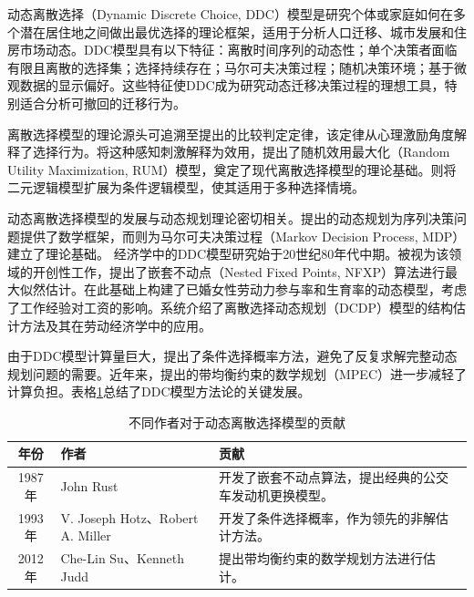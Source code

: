\documentclass[a4paper, zihao=-4, fontset = mac, oneside]{ctexbook} %
\begin{document}
动态离散选择（Dynamic Discrete Choice, DDC）模型是研究个体或家庭如何在多个潜在居住地之间做出最优选择的理论框架，适用于分析人口迁移、城市发展和住房市场动态。DDC模型具有以下特征：离散时间序列的动态性；单个决策者面临有限且离散的选择集；选择持续存在；马尔可夫决策过程；随机决策环境；基于微观数据的显示偏好。这些特征使DDC成为研究动态迁移决策过程的理想工具，特别适合分析可撤回的迁移行为。

离散选择模型的理论源头可追溯至\textcite{thurstoneLawComparativeJudgment1927}提出的比较判定定律，该定律从心理激励角度解释了选择行为。\textcite{marschakBinarychoiceConstraintsRandom1960}将这种感知刺激解释为效用，提出了随机效用最大化（Random Utility Maximization, RUM）模型，奠定了现代离散选择模型的理论基础。\textcite{mcfaddenConditionalLogitAnalysis1973}则将二元逻辑模型扩展为条件逻辑模型，使其适用于多种选择情境。

动态离散选择模型的发展与动态规划理论密切相关。\textcite{bellmanDynamicProgramming1957}提出的动态规划为序列决策问题提供了数学框架，而\textcite{blackwellDiscreteDynamicProgramming1962}则为马尔可夫决策过程（Markov Decision Process, MDP）建立了理论基础。
经济学中的DDC模型研究始于20世纪80年代中期。\textcite{rustOptimalReplacementGMC1987}被视为该领域的开创性工作，提出了嵌套不动点（Nested Fixed Points, NFXP）算法进行最大似然估计。\textcite{ecksteinDynamicLabourForce1989}在此基础上构建了已婚女性劳动力参与率和生育率的动态模型，考虑了工作经验对工资的影响。\textcite{keaneStructuralEstimationBehavioral2011}系统介绍了离散选择动态规划（DCDP）模型的结构估计方法及其在劳动经济学中的应用。

由于DDC模型计算量巨大，\textcite{hotzConditionalChoiceProbabilities1993}提出了条件选择概率方法，避免了反复求解完整动态规划问题的需要。近年来，\textcite{suConstrainedOptimizationApproaches2012}提出的带均衡约束的数学规划（MPEC）进一步减轻了计算负担。表格\ref{tab:不同作者对于动态离散选择模型的贡献}总结了DDC模型方法论的关键发展。

\begin{table}[!ht]
\centering
\caption{不同作者对于动态离散选择模型的贡献}
\label{tab:不同作者对于动态离散选择模型的贡献}
\begin{tabularx}{\textwidth}{@{}cXX@{}} 
\toprule
\textbf{年份} & \textbf{作者} & \textbf{贡献}\\
\midrule
1987年 &John Rust &开发了嵌套不动点算法，提出经典的公交车发动机更换模型。\\
1993年 &V. Joseph Hotz、Robert A. Miller &开发了条件选择概率，作为领先的非解估计方法。\\
2012年 &Che-Lin Su、Kenneth Judd &提出带均衡约束的数学规划方法进行估计。\\
\bottomrule
\end{tabularx}
\end{table}
\end{document}
